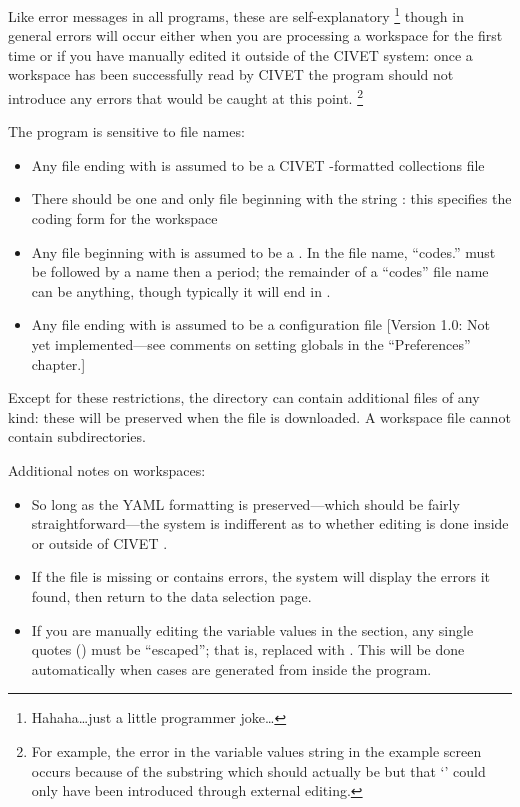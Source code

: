 \documentclass[letterpaper,10pt,english]{sphinxmanual}
\begin{document}
Like error messages in all programs, these are self-explanatory \footnote{
Hahaha…just a little programmer joke…
}
though in general errors will occur either when you are processing a
workspace for the first time or if you have manually edited it outside
of the CIVET system: once a workspace has been successfully read by
CIVET the program should not introduce any errors that would be caught
at this point. \footnote{
For example, the error in the variable values string in the example screen
occurs because of the substring
 which should actually be
 but that ‘\code{=}’ could only have been
introduced through external editing.
}

The program is sensitive to file names:
\begin{itemize}
\item {} 
Any file ending with  is assumed to be a CIVET -formatted
collections file

\item {} 
There should be one and only file beginning with the string
: this specifies the coding form for the workspace

\item {} 
Any file beginning with  is assumed to be a
{\hyperref[workspaces:sec-categories]{\emph{}}}. In the file name,
``codes.'' must be followed by a
 name then a period; the remainder of a ``codes'' file
name can be anything, though typically it will end in .

\item {} 
Any file ending with  is assumed to be a configuration file
{[}Version 1.0: Not yet implemented—see comments on setting globals in
the “Preferences” chapter.{]}

\end{itemize}

Except for these restrictions, the directory can contain additional
files of any kind: these will be preserved when the file is downloaded.
A workspace file cannot contain subdirectories.

Additional notes on workspaces:
\begin{itemize}
\item {} 
So long as the YAML formatting is preserved—which should be fairly
straightforward—the system is indifferent as to whether editing is
done inside or outside of CIVET .

\item {} 
If the  file is missing or contains errors, the system will
display the errors it found, then return to the data selection page.

\item {} 
If you are manually editing the variable values in the 
section, any single quotes () must be “escaped”; that is,
replaced with . This will be done automatically when cases are
generated from inside the program.

\end{itemize}
\end{document}
